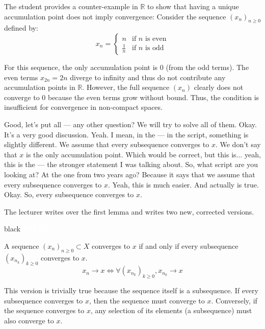 \begin{math-stroke}
The student provides a counter-example in $\mathbb{R}$ to show that having a unique accumulation point does not imply convergence:
Consider the sequence $(x_n)_{n \ge 0}$ defined by:
\[
x_n = \begin{cases} 
n & \text{if } n \text{ is even} \\
\frac{1}{n} & \text{if } n \text{ is odd}
\end{cases}
\]
\begin{explanation-of-steps}
For this sequence, the only accumulation point is $0$ (from the odd terms). The even terms $x_{2n} = 2n$ diverge to infinity and thus do not contribute any accumulation points in $\mathbb{R}$. However, the full sequence $(x_n)$ clearly does not converge to $0$ because the even terms grow without bound. Thus, the condition  is insufficient for convergence in non-compact spaces.
\end{explanation-of-steps}
\end{math-stroke}

\begin{spoken-clean}[00:11:24 - 00:13:40]
Good, let's put all — any other question? We will try to solve all of them. Okay. It's a very good discussion. Yeah. I mean, in the — in the script, something is slightly different. We assume that every subsequence converges to $x$. We don't say that $x$ is the only accumulation point. Which would be correct, but this is... yeah, this is the — the stronger statement I was talking about. So, what script are you looking at? At the one from two years ago? Because it says that we assume that every subsequence converges to $x$. Yeah, this is much easier. And actually is true. Okay. So, every subsequence converges to $x$.
\end{spoken-clean}

\begin{math-stroke}
\begin{nice-box}
The lecturer writes  over the first lemma and writes two new, corrected versions.
\end{nice-box}
\begin{color-box}{black}
\textcolor{white}{\textbf{FALSE}}
\end{color-box}
\begin{lemma}\label{lem:convergence-acc-point-v2}
A sequence $(x_n)_{n \ge 0} \subset X$ converges to $x$ if and only if every subsequence $(x_{n_k})_{k \ge 0}$ converges to $x$.
\[ x_n \to x \iff \forall (x_{n_k})_{k \ge 0}, x_{n_k} \to x \]
\end{lemma}

\begin{explanation-of-steps}
This version is trivially true because the sequence itself is a subsequence. If every subsequence converges to $x$, then the sequence must converge to $x$. Conversely, if the sequence converges to $x$, any selection of its elements (a subsequence) must also converge to $x$.
\end{explanation-of-steps}
\end{math-stroke}

